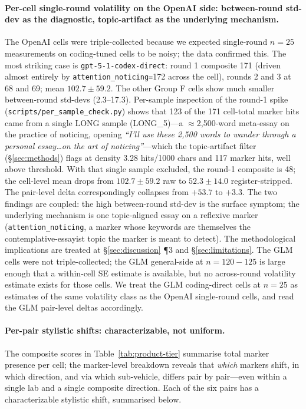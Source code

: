 \documentclass[11pt,a4paper]{article}
\begin{document}
\begin{sloppypar}
\paragraph{Per-cell single-round volatility on the OpenAI side: between-round std-dev as the diagnostic, topic-artifact as the underlying mechanism.} The OpenAI cells were triple-collected because we expected single-round $n{=}25$ measurements on coding-tuned cells to be noisy; the data confirmed this. The most striking case is \texttt{gpt-5-1\allowbreak-codex\allowbreak-direct}: round 1 composite 171 (driven almost entirely by \texttt{attention\allowbreak\_noticing\allowbreak=}172 across the cell), rounds 2 and 3 at 68 and 69; mean $102.7 \pm 59.2$. The other Group F cells show much smaller between-round std-devs (2.3--17.3). Per-sample inspection of the round-1 spike (\texttt{scripts/per\_sample\_check.py}) shows that 123 of the 171 cell-total marker hits came from a single LONG sample (LONG\_5)---a $\approx$2{,}500-word meta-essay on the practice of noticing, opening \emph{``I'll use these 2,500 words to wander through a personal essay\ldots on the art of noticing''}---which the topic-artifact filter (\S\ref{sec:methods}) flags at density 3.28 hits/1000 chars and 117 marker hits, well above threshold. With that single sample excluded, the round-1 composite is 48; the cell-level mean drops from $102.7 \pm 59.2$ raw to $52.3 \pm 14.0$ register-stripped. The pair-level delta correspondingly collapses from $+53.7$ to $+3.3$. The two findings are coupled: the high between-round std-dev is the surface symptom; the underlying mechanism is one topic-aligned essay on a reflexive marker (\texttt{attention\allowbreak\_noticing}, a marker whose keywords are themselves the contemplative-essayist topic the marker is meant to detect). The methodological implications are treated at \S\ref{sec:discussion} \P3 and \S\ref{sec:limitations}. The GLM cells were not triple-collected; the GLM general-side at $n{=}120{-}125$ is large enough that a within-cell SE estimate is available, but no across-round volatility estimate exists for those cells. We treat the GLM coding-direct cells at $n{=}25$ as estimates of the same volatility class as the OpenAI single-round cells, and read the GLM pair-level deltas accordingly.
\end{sloppypar}

\paragraph{Per-pair stylistic shifts: characterizable, not uniform.} The composite scores in Table~\ref{tab:product-tier} summarise total marker presence per cell; the marker-level breakdown reveals that \emph{which} markers shift, in which direction, and via which sub-vehicle, differs pair by pair---even within a single lab and a single composite direction. Each of the six pairs has a characterizable stylistic shift, summarised below.
\end{document}
